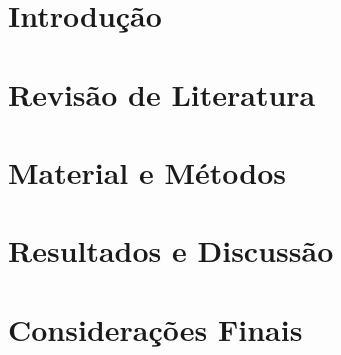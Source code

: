 \documentclass[
	12pt,				%
	openright,			%
	oneside,			%
	a4paper,			%
	brazil				%
	]{abntex2}
\begin{document}



\tableofcontents*
\cleardoublepage



\textual

\chapter{Introdução}


\chapter{Revisão de Literatura}


\chapter{Material e Métodos}


\chapter{Resultados e Discussão}


\chapter{Considerações Finais}


\end{document}
